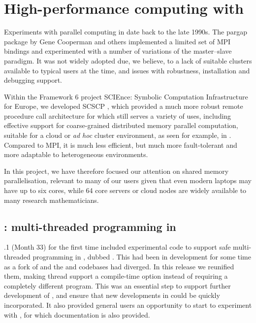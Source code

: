 \section{High-performance computing with \GAP}\label{sec:hpc}

Experiments with parallel computing in \GAP date back to the late
1990s. The pargap package by Gene Cooperman and others \cite{pargap}
implemented a limited set of MPI bindings and experimented with a
number of variations of the master--slave paradigm. It was not
widely adopted due, we believe, to a lack of suitable clusters available to typical
\GAP users at the time, and issues with robustness, installation and
debugging support.

Within the Framework 6 project SCIEnce: Symbolic Computation
Infrastructure for Europe, we developed SCSCP \cite{SCSCP}, which
provided a much more robust remote procedure call architecture for
\GAP which still serves a variety of uses, including effective support
for coarse-grained distributed memory parallel computation, suitable
for a cloud or \textit{ad hoc} cluster environment, as seen for
example, in \cite{loughlin}. Compared to MPI, it is much less
efficient, but much more fault-tolerant and more adaptable to
heterogeneous environments.

In this project, we have therefore focused our attention on shared
memory parallelisation, relevant to many of our users given that even
modern laptops may have up to six cores, while 64 core servers or
cloud nodes are widely available to many research mathematicians.

\subsection{\HPCGAP: multi-threaded programming in \GAP}\label{hpc-gap}

.1 (Month 33) for the first time included experimental code to 
support safe multi-threaded programming in \GAP, dubbed \HPCGAP. This
had been in development for some time as a fork of \GAP and the \HPCGAP and \GAP
codebases had diverged. In this release we reunified them,
making thread support a compile-time option instead of requiring a completely
different program. This was an essential step to support further development of
\HPCGAP, and ensure that new developments in \GAP could be quickly
incorporated. It also provided general \GAP users an opportunity to start to experiment 
with \HPCGAP, for which documentation is also provided.


